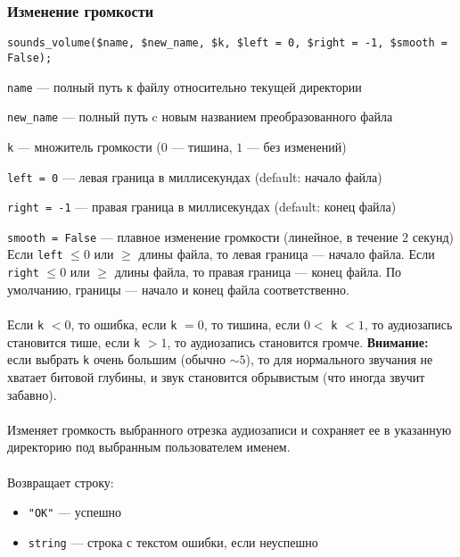 \documentclass[14pt,a4paper]{article}
\begin{document}
\subsubsection*{Изменение громкости}

\begin{lstlisting}
sounds_volume($name, $new_name, $k, $left = 0, $right = -1, $smooth = False);
\end{lstlisting}

\lstinline{name} --- полный путь к файлу относительно текущей директории \par
\lstinline{new_name} --- полный путь c новым названием преобразованного файла \par
\lstinline{k} --- множитель громкости ($0$ --- тишина, $1$ --- без изменений)\par
\lstinline{left = 0} --- левая граница в миллисекундах (default: начало файла) \par
\lstinline{right = -1} --- правая граница в миллисекундах (default: конец файла) \par
\lstinline{smooth = False} --- плавное изменение громкости (линейное, в течение $2$ секунд) \\

\noindent Если \lstinline{left} $\leq 0$ или $\geq$ длины файла, то левая граница --- начало файла. Если \lstinline{right} $\leq 0$ или $\geq$ длины файла, то правая граница --- конец файла. По умолчанию, границы --- начало и конец файла соответственно. \\\\
Если \lstinline{k} $< 0$, то ошибка, если \lstinline{k} $= 0$, то тишина, если $0 <$ \lstinline{k} $< 1$, то аудиозапись становится тише, если \lstinline{k} $> 1$, то аудиозапись становится громче. \textbf{Внимание:} если выбрать \lstinline{k} очень большим (обычно $\sim 5$), то для нормального звучания не хватает битовой глубины, и звук становится обрывистым (что иногда звучит забавно).\\\\
Изменяет громкость выбранного отрезка аудиозаписи и сохраняет ее в указанную директорию под выбранным пользователем именем. \\\\
Возвращает строку:
\smallskip
\begin{itemize}
\item \lstinline{"OK"} --- успешно
\item \lstinline{string} --- строка с текстом ошибки, если неуспешно
\end{itemize}
\end{document}
